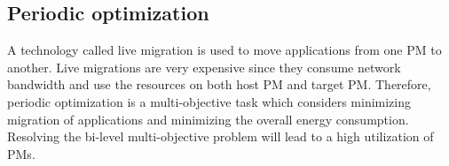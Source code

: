 


\subsection{Periodic optimization}



 A technology called live migration is used to move applications from one PM to another. Live migrations are very expensive since they consume network bandwidth and use the resources on both host PM and target PM. Therefore, periodic optimization is a multi-objective task which considers minimizing migration of applications and minimizing the overall energy consumption. Resolving the bi-level multi-objective problem will lead to a high utilization of PMs.

